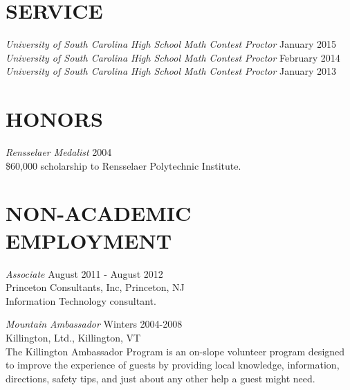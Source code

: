 \documentclass[line,overlapped]{res}
\begin{document}
\begin{resume}
 \section{SERVICE}
         \textsl{University of South Carolina High School Math Contest Proctor} \hfill January 2015\\
         \textsl{University of South Carolina High School Math Contest Proctor} \hfill February 2014\\
         \textsl{University of South Carolina High School Math Contest Proctor} \hfill January 2013

 \section{HONORS}
         \textsl{Rensselaer Medalist} \hfill 2004\\
         \$60,000 scholarship to Rensselaer Polytechnic Institute.
\newpage
 \section{NON-ACADEMIC\\EMPLOYMENT}             
         \textsl{Associate} \hfill August 2011 - August 2012\\
         Princeton Consultants, Inc, Princeton, NJ\\
         Information Technology consultant.

         \textsl{Mountain Ambassador} \hfill Winters 2004-2008\\
         Killington, Ltd., Killington, VT \\
         The Killington Ambassador Program is an on-slope volunteer program
         designed to improve the experience of guests by providing local knowledge, 
         information, directions, safety tips, and just about any other help a guest might need.


\end{resume}
\end{document}
